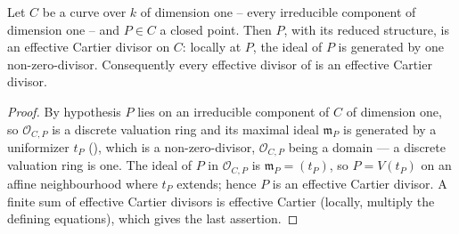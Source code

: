 \begin{lemma}
\label{lem:pcb-point-cartier}
Let \(C\) be a  curve over \(k\) of
dimension one -- every irreducible component of dimension one -- and
\(P\in C\) a closed point.  Then \(P\), with its reduced structure,
is an effective Cartier divisor on \(C\): locally at \(P\), the ideal
of \(P\) is generated by one non-zero-divisor.  Consequently every
effective divisor of  is an effective Cartier
divisor.
\end{lemma}
\begin{proof}
By hypothesis \(P\) lies on an irreducible component of \(C\) of
dimension one, so \(\mathcal O_{C,P}\) is a discrete valuation ring and
its maximal ideal \(\mathfrak m_P\) is generated by a uniformizer
\(t_P\) (), which is a
non-zero-divisor, \(\mathcal O_{C,P}\) being a domain --- a discrete
valuation ring is one.  The
ideal of \(P\) in \(\mathcal O_{C,P}\) is \(\mathfrak m_P=(t_P)\), so
\(P=V(t_P)\) on an affine neighbourhood where \(t_P\) extends; hence
\(P\) is an effective Cartier divisor.  A finite sum of effective
Cartier divisors is effective Cartier (locally, multiply the defining
equations), which gives the last assertion.
\end{proof}

